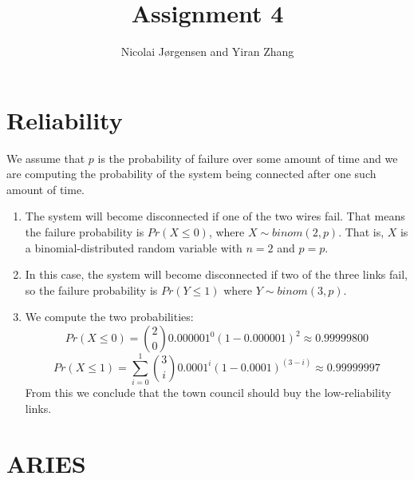 \documentclass[11pt]{article}
\title          {Assignment 4}
\author         {Nicolai Jørgensen and Yiran Zhang}
\begin{document}
\maketitle
\newpage

\section{Reliability}

We assume that $p$ is the probability of failure over some amount of time and we
are computing the probability of the system being connected after one such
amount of time.

\begin{enumerate}
  \item
    The system will become disconnected if one of the two wires fail. That means
    the failure probability is $Pr(X \leq 0)$, where $X \sim binom(2,p)$. That is,
    $X$ is a binomial-distributed random variable with $n = 2$ and $p = p$.
  \item
    In this case, the system will become disconnected if two of the three links
    fail, so the failure probability is $Pr(Y \leq 1)$ where $Y \sim binom(3,p)$.
  \item
    We compute the two probabilities:
    $$ Pr(X \leq 0) = { 2 \choose 0 } 0.000001^0(1-0.000001)^2 \approx 0.99999800 $$
    $$ Pr(X \leq 1) = \sum_{i=0}^1 { 3 \choose i }0.0001^i(1-0.0001)^{(3-i)} \approx 0.99999997 $$
    From this we conclude that the town council should buy the low-reliability links.
\end{enumerate}

\section{ARIES}
\end{document}
